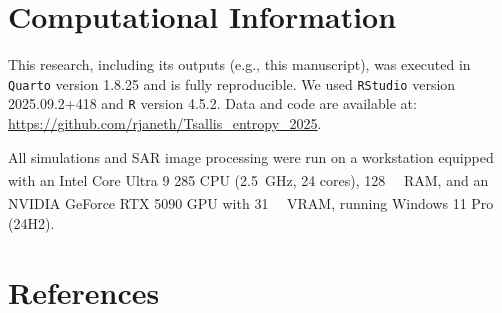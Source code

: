 \documentclass[
  lettersize  journal,
]{IEEEtran}%
\begin{document}
\section*{Computational Information}\label{computational-information}

This research, including its outputs (e.g., this manuscript), was
executed in \texttt{Quarto} version 1.8.25 and is fully reproducible. We
used \texttt{RStudio} version 2025.09.2+418 and \texttt{R} version
4.5.2. Data and code are available at:
\url{https://github.com/rjaneth/Tsallis_entropy_2025}.

All simulations and SAR image processing were run on a workstation
equipped with an Intel\textsuperscript{\textregistered}
Core\texttrademark{} Ultra 9 285 CPU (\SI{2.5}{\giga\hertz}, 24 cores),
\SI{128}{\giga\byte} RAM, and an NVIDIA\textsuperscript{\textregistered}
GeForce RTX 5090 GPU with \SI{31}{\giga\byte} VRAM, running Windows 11
Pro (24H2).

\section*{References}\label{references}
\end{document}
